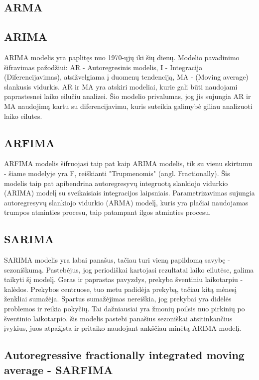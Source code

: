 \documentclass{VUMIFInfKursinis}
\begin{document}
\subsection {ARMA}

\subsection {ARIMA}
ARIMA modelis yra paplitęs nuo 1970-ųjų iki šių dienų. Modelio pavadinimo šifravimas pažodžiui: AR - Autoregresinis modelis,
I - Integracija (Diferencijavimas), atsižvelgiama į duomenų tendenciją, MA - (Moving average) slankusis vidurkis. AR ir MA yra atskiri
modeliai, kurie gali būti naudojami paprastesnei laiko eilučiu analizei. Šio modelio privalumas, jog jis sujungia AR ir MA naudojimą kartu su
diferencijavimu, kuris suteikia galimybė giliau analizuoti laiko eilutes.

\subsection {ARFIMA}
ARFIMA modelis šifruojasi taip pat kaip ARIMA modelis, tik su vienu skirtumu - šiame modelyje yra F, reiškianti "Trupmenomis" (angl. Fractionally).
Šis modelis taip pat apibendrina autoregresyvų integruotą slankiojo vidurkio (ARIMA) modelį su sveikaisiais integracijos laipsniais.
Parametrizavimas sujungia autoregresyvų slankiojo vidurkio (ARMA) modelį, kuris yra plačiai naudojamas trumpos atminties procesu, taip 
patampant ilgos atminties procesu.

\subsection {SARIMA}
SARIMA modelis yra labai panašus, tačiau turi vieną papildomą savybę - sezoniškumą. Pastebėjus, jog periodiškai kartojasi rezultatai laiko eilutėse, 
galima taikyti šį modelį. Geras ir paprastas pavyzdys, prekyba šventiniu laikotarpiu - kalėdos. Prekybos centruose, tuo metu padidėja prekybą, tačiau 
kitą mėnesį ženkliai sumažėja. Spartus sumažėjimas nereiškia, jog prekybai yra didėlės problemos ir reikia pokyčių. Tai dažniausiai yra žmonių 
poilsis nuo pirkinių po šventinio laikotarpio. šis modelis pastebi panašius sezoniškai atsitinkančius įvykius, juos atpažįsta ir pritaiko naudojant
ankščiau minėtą ARIMA modelį. 

\subsection {Autoregressive fractionally integrated moving average - SARFIMA}
\end{document}

